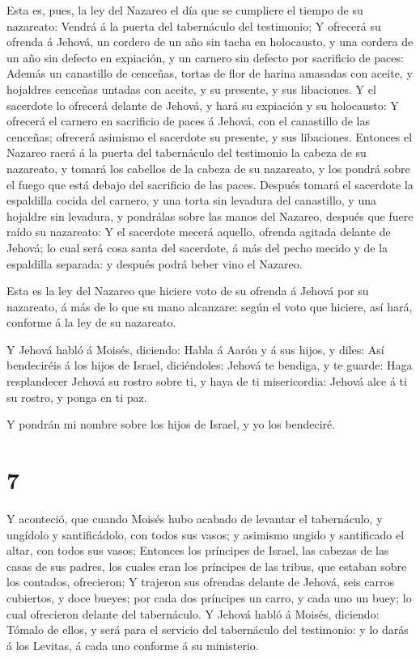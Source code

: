  Esta es, pues, la ley del Nazareo el día que se cumpliere
el tiempo de su nazareato: Vendrá á la puerta del tabernáculo del
testimonio;  Y ofrecerá su ofrenda á Jehová, un cordero de
un año sin tacha en holocausto, y una cordera de un año sin defecto en
expiación, y un carnero sin defecto por sacrificio de paces:
 Además un canastillo de cenceñas, tortas de flor de harina
amasadas con aceite, y hojaldres cenceñas untadas con aceite, y su
presente, y sus libaciones.  Y el sacerdote lo ofrecerá
delante de Jehová, y hará su expiación y su holocausto:  Y
ofrecerá el carnero en sacrificio de paces á Jehová, con el canastillo
de las cenceñas; ofrecerá asimismo el sacerdote su presente, y sus
libaciones.  Entonces el Nazareo raerá á la puerta del
tabernáculo del testimonio la cabeza de su nazareato, y tomará los
cabellos de la cabeza de su nazareato, y los pondrá sobre el fuego que
está debajo del sacrificio de las paces.  Después tomará el
sacerdote la espaldilla cocida del carnero, y una torta sin levadura del
canastillo, y una hojaldre sin levadura, y pondrálas sobre las manos del
Nazareo, después que fuere raído su nazareato:  Y el
sacerdote mecerá aquello, ofrenda agitada delante de Jehová; lo cual
será cosa santa del sacerdote, á más del pecho mecido y de la espaldilla
separada: y después podrá beber vino el Nazareo.

 Esta es la ley del Nazareo que hiciere voto de su ofrenda
á Jehová por su nazareato, á más de lo que su mano alcanzare: según el
voto que hiciere, así hará, conforme á la ley de su nazareato.

 Y Jehová habló á Moisés, diciendo:  Habla á
Aarón y á sus hijos, y diles: Así bendeciréis á los hijos de Israel,
diciéndoles:  Jehová te bendiga, y te guarde: 
Haga resplandecer Jehová su rostro sobre ti, y haya de ti misericordia:
 Jehová alce á ti su rostro, y ponga en ti paz.

 Y pondrán mi nombre sobre los hijos de Israel, y yo los
bendeciré.

\hypertarget{section-6}{%
\section{7}\label{section-6}}

 Y aconteció, que cuando Moisés hubo acabado de levantar el
tabernáculo, y ungídolo y santificádolo, con todos sus vasos; y asimismo
ungido y santificado el altar, con todos sus vasos; 
Entonces los príncipes de Israel, las cabezas de las casas de sus
padres, los cuales eran los príncipes de las tribus, que estaban sobre
los contados, ofrecieron;  Y trajeron sus ofrendas delante
de Jehová, seis carros cubiertos, y doce bueyes; por cada dos príncipes
un carro, y cada uno un buey; lo cual ofrecieron delante del
tabernáculo.  Y Jehová habló á Moisés, diciendo:
 Tómalo de ellos, y será para el servicio del tabernáculo
del testimonio: y lo darás á los Levitas, á cada uno conforme á su
ministerio.

